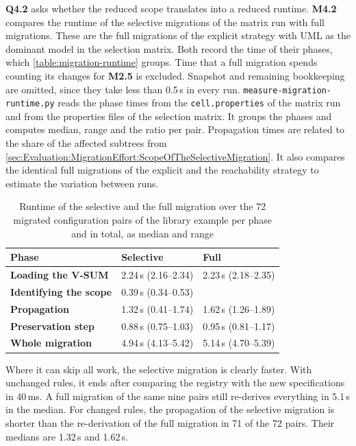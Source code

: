 \textbf{Q4.2} asks whether the reduced scope translates into a reduced runtime.
\textbf{M4.2} compares the runtime of the selective migrations of the matrix run with full migrations.
These are the full migrations of the explicit strategy with UML as the dominant model in the selection matrix.
Both record the time of their phases, which \autoref{table:migration-runtime} groups.
Time that a full migration spends counting its changes for \textbf{M2.5} is excluded.
Snapshot and remaining bookkeeping are omitted, since they take less than 0.5\,s in every run.
\texttt{measure-migration-runtime.py} reads the phase times from the \texttt{cell.properties} of the matrix run and from the properties files of the selection matrix.
It groups the phases and computes median, range and the ratio per pair.
Propagation times are related to the share of the affected subtrees from \autoref{sec:Evaluation:MigrationEffort:ScopeOfTheSelectiveMigration}.
It also compares the identical full migrations of the explicit and the reachability strategy to estimate the variation between runs.

\begin{table}[htbp]
    \centering
    \begin{tabular}{|l|l|l|}
        \hline
        \textbf{Phase}                 & \textbf{Selective}   & \textbf{Full}        \\
        \hline
        \textbf{Loading the V-SUM}     & 2.24\,s (2.16--2.34) & 2.23\,s (2.18--2.35) \\
        \hline
        \textbf{Identifying the scope} & 0.39\,s (0.34--0.53) &                      \\
        \hline
        \textbf{Propagation}           & 1.32\,s (0.41--1.74) & 1.62\,s (1.26--1.89) \\
        \hline
        \textbf{Preservation step}     & 0.88\,s (0.75--1.03) & 0.95\,s (0.81--1.17) \\
        \hline
        \textbf{Whole migration}       & 4.94\,s (4.13--5.42) & 5.14\,s (4.70--5.39) \\
        \hline
    \end{tabular}
    \caption{Runtime of the selective and the full migration over the 72 migrated configuration pairs of the library example per phase and in total, as median and range}
    \label{table:migration-runtime}
\end{table}

Where it can skip all work, the selective migration is clearly faster.
With unchanged rules, it ends after comparing the registry with the new specifications in 40\,ms.
A full migration of the same nine pairs still re-derives everything in 5.1\,s in the median.
For changed rules, the propagation of the selective migration is shorter than the re-derivation of the full migration in 71 of the 72 pairs.
Their medians are 1.32\,s and 1.62\,s.

